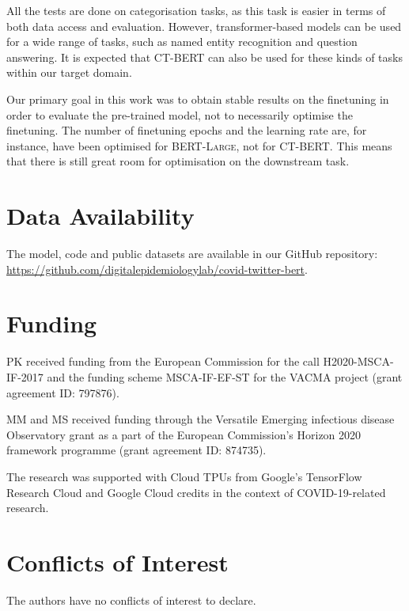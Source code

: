 \documentclass{article}
\begin{document}
\begin{multicols}{2}
All the tests are done on categorisation tasks, as this task is easier in terms of both data access and evaluation.
However, transformer-based models can be used for a wide range of tasks, such as named entity recognition and question answering.
It is expected that \textsc{CT-BERT} can also be used for these kinds of tasks within our target domain.

Our primary goal in this work was to obtain stable results on the finetuning in order to evaluate the pre-trained model, not to necessarily optimise the finetuning.
The number of finetuning epochs and the learning rate are, for instance, have been optimised for \textsc{BERT-Large}, not for \textsc{CT-BERT}.
This means that there is still great room for optimisation on the downstream task.


\section{Data Availability}
The model, code and public datasets are available in our GitHub repository: \url{https://github.com/digitalepidemiologylab/covid-twitter-bert}.

\section{Funding}
PK received funding from the European Commission for the call H2020-MSCA-IF-2017 and the funding scheme MSCA-IF-EF-ST for the VACMA project (grant agreement ID: 797876).

MM and MS received funding through the Versatile Emerging infectious disease Observatory grant as a part of the European Commission’s Horizon 2020 framework programme (grant agreement ID: 874735).

The research was supported with Cloud TPUs from Google's TensorFlow Research Cloud and Google Cloud credits in the context of COVID-19-related research.

\section{Conflicts of Interest}
The authors have no conflicts of interest to declare.

\end{multicols}



\end{document}
